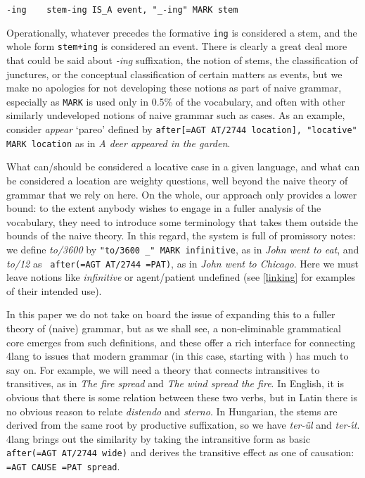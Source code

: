 \documentclass[11pt,bookmarks,bookmarksnumbered,naturalnames,plainpages=false,pdftex,colorlinks=true,urlcolor=blue,bookmarksdepth=subsection,plainpages=false]{paper}
\begin{document}
\begin{verbatim}
-ing    stem-ing IS_A event, "_-ing" MARK stem
\end{verbatim}

Operationally, whatever precedes the formative {\tt ing} is considered a stem,
and the whole form {\tt stem+ing} is considered an event. There is clearly a
great deal more that could be said about {\it -ing} suffixation, the notion of
stems, the classification of junctures, or the conceptual classification of
certain matters as events, but we make no apologies for not developing these
notions as part of naive grammar, especially as {\tt MARK} is used only in
0.5\% of the vocabulary, and often with other similarly undeveloped notions of
naive grammar such as cases. As an example, consider {\it appear} `pareo'
defined by {\tt after[=AGT AT/2744 location], "locative" MARK location} as in
{\it A deer appeared in the garden}.

What can/should be considered a locative case in a given language, and what
can be considered a location are weighty questions, well beyond the naive
theory of grammar that we rely on here. On the whole, our approach only
provides a lower bound: to the extent anybody wishes to engage in a fuller
analysis of the vocabulary, they need to introduce some terminology that takes
them outside the bounds of the naive theory. In this regard, the system is
full of promissory notes: we define {\it to/3600} by {\tt "to/3600 \_" MARK
  infinitive}, as in {\it John went to eat}, and {\it to/12} as {\tt
  after(=AGT AT/2744 =PAT)}, as in {\it John went to Chicago}. Here we must
leave notions like {\it infinitive} or agent/patient undefined (see
\ref{linking} for examples of their intended use).

In this paper we do not take on board the issue of expanding this to a fuller
theory of (naive) grammar, but as we shall see, a non-eliminable grammatical
core emerges from such definitions, and these offer a rich interface for
connecting 4lang to issues that modern grammar (in this case, starting with
\cite{Fillmore:1968}) has much to say on. For example, we will need a theory
that connects intransitives to transitives, as in {\it The fire spread} and
{\it The wind spread the fire}. In English, it is obvious that there is some
relation between these two verbs, but in Latin there is no obvious reason to
relate {\it distendo} and {\it sterno}. In Hungarian, the stems are derived
from the same root by productive suffixation, so we have {\it ter-\"ul} and
{\it ter-\'{\i}t}. 4lang brings out the similarity by taking the intransitive
form as basic {\tt after(=AGT AT/2744 wide)} and derives the transitive effect
as one of causation: {\tt =AGT CAUSE {=PAT spread}}.
\end{document}
